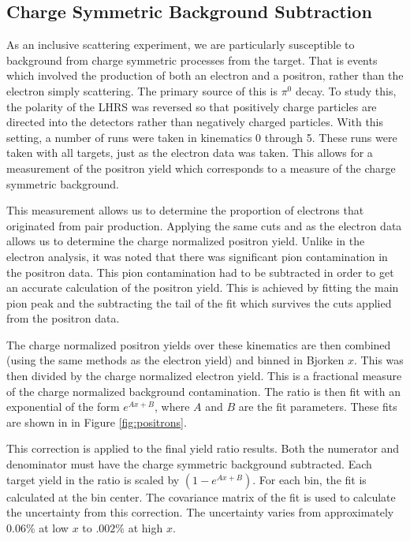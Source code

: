 \subsection{Charge Symmetric Background Subtraction}

As an inclusive scattering experiment, we are particularly susceptible to background from charge symmetric processes from the target. That is events which involved the production of both an electron and a positron, rather than the electron simply scattering. The primary source of this is $\pi^0$ decay. To study this, the polarity of the LHRS was reversed so that positively charge particles are directed into the detectors rather than negatively charged particles. With this setting, a number of runs were taken in kinematics 0 through 5. These runs were taken with all targets, just as the electron data was taken. This allows for a measurement of the positron yield which corresponds to a measure of the charge symmetric background.

This measurement allows us to determine the proportion of electrons that originated from pair production. Applying the same cuts and as the electron data allows us to determine the charge normalized positron yield. Unlike in the electron analysis, it was noted that there was significant pion contamination in the positron data. This pion contamination had to be subtracted in order to get an accurate calculation of the positron yield. This is achieved by fitting the main pion peak and the subtracting the tail of the fit which survives the cuts applied from the positron data.

The charge normalized positron yields over these kinematics are then combined (using the same methods as the electron yield) and binned in Bjorken $x$. This was then divided by the charge normalized electron yield. This is a fractional measure of the charge normalized background contamination. The ratio is then fit with an exponential of the form $e^{Ax + B}$, where $A$ and $B$ are the fit parameters. These fits are shown in in Figure \ref{fig:positrons}.

This correction is applied to the final yield ratio results. Both the numerator and denominator must have the charge symmetric background subtracted. Each target yield in the ratio is scaled by $\left(1 - e^{Ax + B}\right)$. For each bin, the fit is calculated at the bin center. The covariance matrix of the fit is used to calculate the uncertainty from this correction. The uncertainty varies from approximately $0.06\%$ at low $x$ to $.002\%$ at high $x$.

